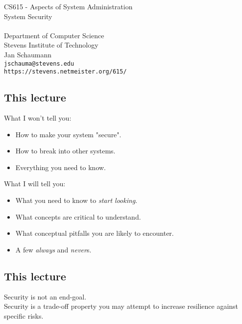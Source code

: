 \documentclass[xga]{xdvislides}
\begin{document}
\setfontphv

\lhead{\slidetitle}                               %
\cfoot{\relax}                               %
\rfoot{\Gray{\today}}
\vspace*{\fill}
\begin{center}
	\Hugesize
		CS615 - Aspects of System Administration\\ [1em]
		System Security\\ [1em]
	\hspace*{5mm}\blueline\\ [1em]
	\Normalsize
		Department of Computer Science\\
		Stevens Institute of Technology\\
		Jan Schaumann\\
		\verb+jschauma@stevens.edu+ \\
		\verb+https://stevens.netmeister.org/615/+
\end{center}
\vspace*{\fill}

\subsection{This lecture}
What I won't tell you:
\begin{itemize}
	\item How to make your system "secure".
	\item How to break into other systems.
	\item Everything you need to know.
\end{itemize}
\vspace{.5in}
What I will tell you:
\begin{itemize}
	\item What you need to know to {\em start looking}.
	\item What concepts are critical to understand.
	\item What conceptual pitfalls you are likely to encounter.
	\item A few {\em always} and {\em never}s.
\end{itemize}

\subsection{This lecture}
\vspace{.5in}
\Huge
\begin{center}
Security is not an end-goal. \\

\vspace{.5in}
Security is a trade-off property you may attempt to
increase resilience against specific risks.
\end{center}
\Normalsize
\end{document}
